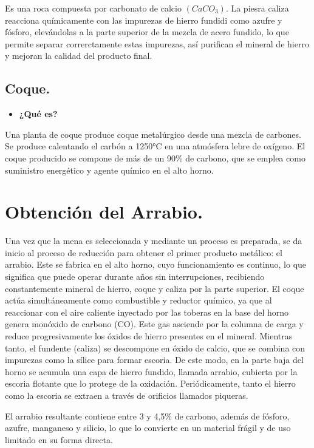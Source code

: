 \documentclass[12pt,a4paper]{article}
\begin{document}
Es una roca compuesta por carbonato de calcio $(CaCO_3)$. La piesra caliza reacciona químicamente con las impurezas de hierro fundidi como azufre y fósforo, elevándolas a la parte superior de la mezcla de acero fundido, lo que permite separar correrctamente estas impurezas, así purifican el mineral de hierro y mejoran la calidad del producto final.

\subsection{Coque.}
\begin{itemize}
    \item \textbf{¿Qué es?}
\end{itemize}

Una planta de coque produce coque metalúrgico desde una mezcla de carbones. Se produce calentando el carbón a 1250°C en una atmósfera lebre de oxígeno. El coque producido se compone de más de un 90\% de carbono, que se emplea como suministro energético y agente químico en el alto horno.


\section{Obtención del Arrabio.}
Una vez que la mena es seleccionada y mediante un proceso es preparada, se da inicio al proceso de reducción para obtener el primer producto metálico: el arrabio. Este se fabrica en el alto horno, cuyo funcionamiento es continuo, lo que significa que puede operar durante años sin interrupciones, recibiendo constantemente mineral de hierro, coque y caliza por la parte superior. El coque actúa simultáneamente como combustible y reductor químico, ya que al reaccionar con el aire caliente inyectado por las toberas en la base del horno genera monóxido de carbono (CO). Este gas asciende por la columna de carga y reduce progresivamente los óxidos de hierro presentes en el mineral. Mientras tanto, el fundente (caliza) se descompone en óxido de calcio, que se combina con impurezas como la sílice para formar escoria. De este modo, en la parte baja del horno se acumula una capa de hierro fundido, llamada arrabio, cubierta por la escoria flotante que lo protege de la oxidación. Periódicamente, tanto el hierro como la escoria se extraen a través de orificios llamados piqueras. 

El arrabio resultante contiene entre 3 y 4,5\% de carbono, además de fósforo, azufre, manganeso y silicio, lo que lo convierte en un material frágil y de uso limitado en su forma directa.
\end{document}
